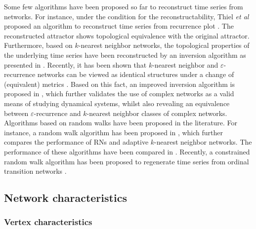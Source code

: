 		Some few algorithms have been proposed so far to reconstruct time series from networks. For instance, under the condition for the reconstructability, Thiel {\textit{et al}} proposed an algorithm to reconstruct time series from recurrence plot \cite{thiel2004b}. The reconstructed attractor shows topological equivalence with the original attractor. Furthermore, based on $k$-nearest neighbor networks, the topological properties of the underlying time series have been reconstructed by an inversion algorithm as presented in \cite{hirata2008}. Recently, it has been shown that $k$-nearest neighbor and $\varepsilon$-recurrence networks can be viewed as identical structures under a change of (equivalent) metrics \cite{Khor2016}. Based on this fact, an improved inversion algorithm is proposed in \cite{Khor2016}, which further validates the use of complex networks as a valid means of studying dynamical systems, whilst also revealing an equivalence between $\varepsilon$-recurrence and $k$-nearest neighbor classes of complex networks. Algorithms based on random walks have been proposed in the literature. For instance, a random walk algorithm has been proposed in \cite{Hou2015}, which further compares the performance of RNs and adaptive $k$-nearest neighbor networks. The performance of these algorithms have been compared in \cite{Liu2013c}. Recently, a constrained random walk algorithm has been proposed to regenerate time series from ordinal transition networks \cite{McCullough2017}. 
		
	


\iffalse
	\subsection{Network characteristics}
		\subsubsection{Vertex characteristics}
        
